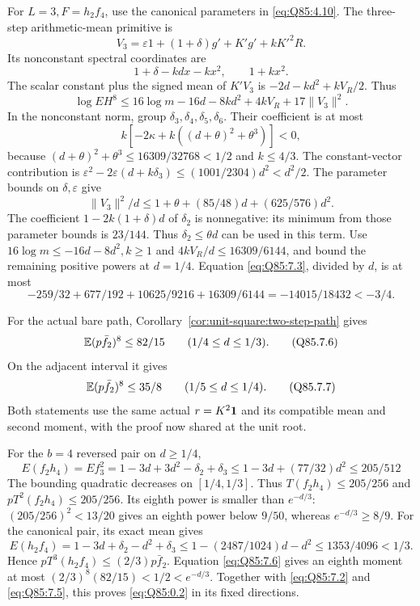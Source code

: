 For \(L=\allowbreak 3,\allowbreak F=\allowbreak h_2f_4\), use the canonical parameters in
\eqref{eq:Q85:4.10}. The three-step arithmetic-mean primitive is
\[
 V_3=\varepsilon1+(1+\delta)g'+K'g'+kK'^2R.
\]
Its nonconstant spectral coordinates are
\[
 1+\delta-kdx-kx^2,\qquad 1+kx^2.
\]
The scalar constant plus the signed mean of \(K'V_3\) is
\(-2d-kd^2+kV_R/2\). Thus
\[
 \log EH^8\le16\log m-16d-8kd^2+4kV_R+17\|V_3\|^2. \tag{Q85.7.3}\label{eq:Q85:7.3}
\]
In the nonconstant norm, group \(\delta_3,\allowbreak \delta_4,\allowbreak \delta_5,\allowbreak \delta_6\).
Their coefficient is at most
\[
 k[-2\kappa+k((d+\theta)^2+\theta^3)]<0,
\]
because
\((d+\theta)^2+\theta^3\le\allowbreak 16309/32768<\allowbreak 1/2\) and \(k\le\allowbreak 4/3\).
The constant-vector contribution is
\(\varepsilon^2-2\varepsilon(d+k\delta_3)
\le(1001/2304)d^2<d^2/2\).
The parameter bounds on \(\delta,\allowbreak \varepsilon\) give
\[
 \|V_3\|^2/d\le1+\theta+(85/48)d+(625/576)d^2.        \tag{Q85.7.4}\label{eq:Q85:7.4}
\]
The coefficient \(1-2k(1+\delta)d\) of \(\delta_2\) is nonnegative:
its minimum from those parameter bounds is \(23/144\).
Thus \(\delta_2\le\allowbreak \theta d\) can be used in this term.
Use \(16\log m\le\allowbreak -16d-8d^2,\allowbreak k\ge\allowbreak 1\) and
\(4kV_R/d\le\allowbreak 16309/6144\), and bound the remaining positive powers at \(d=\allowbreak 1/4\).
Equation \eqref{eq:Q85:7.3}, divided by \(d\), is at most
\[
 -259/32+677/192+10625/9216+16309/6144
 =-14015/18432<-3/4.                                 \tag{Q85.7.5}\label{eq:Q85:7.5}
\]

For the actual bare path, Corollary~\ref{cor:unit-square:two-step-path}
gives
\[
 \mathbb E(p\bar f_2)^8\le82/15\qquad(1/4\le d\le1/3).
 \tag{Q85.7.6}\label{eq:Q85:7.6}
\]
On the adjacent interval it gives
\[
 \mathbb E(p\bar f_2)^8\le35/8\qquad(1/5\le d\le1/4).
 \tag{Q85.7.7}\label{eq:Q85:7.7}
\]
Both statements use the same actual \(r=K^2\mathbf1\) and its compatible
mean and second moment, with the proof now shared at the unit root.

For the \(b=\allowbreak 4\) reversed pair on \(d\ge\allowbreak 1/4\),
\[
 E(f_2h_4)=Ef_3^2=1-3d+3d^2-\delta_2+\delta_3
 \le1-3d+(77/32)d^2\le205/512                       \tag{Q85.7.8}\label{eq:Q85:7.8}
\]
The bounding quadratic decreases on \([1/4,\allowbreak 1/3]\).
Thus \(T(f_2h_4)\le\allowbreak 205/256\) and
\(pT^2(f_2h_4)\le\allowbreak 205/256\).
Its eighth power is smaller than \(e^{-d/3}\):
\((205/256)^2<\allowbreak 13/20\) gives an eighth power below \(9/50\), whereas
\(e^{-d/3}\ge\allowbreak 8/9\).
For the canonical pair, its exact mean gives
\[
 E(h_2f_4)=1-3d+\delta_2-d^2+\delta_3
 \le1-(2487/1024)d-d^2\le1353/4096<1/3.              \tag{Q85.7.9}\label{eq:Q85:7.9}
\]
Hence \(pT^3(h_2f_4)\le\allowbreak (2/3)p\bar f_2\).
Equation \eqref{eq:Q85:7.6} gives an eighth moment at most
\((2/3)^8(82/15)<\allowbreak 1/2<\allowbreak e^{-d/3}\).
Together with \eqref{eq:Q85:7.2} and \eqref{eq:Q85:7.5}, this proves
\eqref{eq:Q85:0.2} in its fixed directions.

